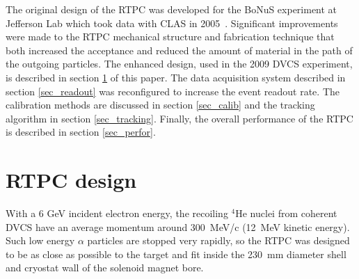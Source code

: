 \documentclass[preprint,5p]{elsarticle}
\begin{document}
The original design of the RTPC was developed for the BoNuS 
experiment at Jefferson Lab which took data with CLAS in 
2005~\cite{Fenker:2008zz}. Significant improvements were made to the RTPC mechanical 
structure and fabrication technique that both increased the acceptance and 
reduced the amount of material in the path of the outgoing particles. The enhanced design, 
used in the 2009 DVCS experiment, is described in section \ref{sec_design} 
of this paper. The 
data acquisition system described in section \ref{sec_readout} was reconfigured 
to increase the event readout rate. The calibration methods 
are discussed in section \ref{sec_calib} and the tracking algorithm in section
\ref{sec_tracking}. Finally, the overall performance
of the RTPC is described in section \ref{sec_perfor}.

\section{RTPC design} \label{sec_design}

With a 6 GeV incident electron energy, the recoiling $^{4}$He nuclei from 
coherent DVCS have an average momentum around 300~MeV/c (12~MeV kinetic 
energy). Such low energy $\alpha$ particles are stopped very rapidly, so the 
RTPC was designed to be as close as possible to the target and fit inside the 
230~mm diameter shell and cryostat wall of the solenoid magnet bore. 
\end{document}
